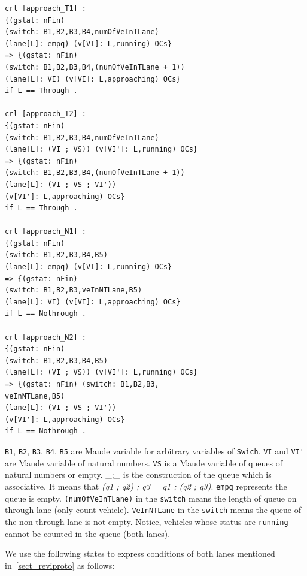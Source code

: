 \documentclass[10pt, conference, compsocconf]{IEEEtran}
\begin{document}
\begin{footnotesize}
\begin{verbatim}
crl [approach_T1] : 
{(gstat: nFin) 
(switch: B1,B2,B3,B4,numOfVeInTLane) 
(lane[L]: empq) (v[VI]: L,running) OCs} 
=> {(gstat: nFin) 
(switch: B1,B2,B3,B4,(numOfVeInTLane + 1)) 
(lane[L]: VI) (v[VI]: L,approaching) OCs} 
if L == Through .

crl [approach_T2] : 
{(gstat: nFin) 
(switch: B1,B2,B3,B4,numOfVeInTLane) 
(lane[L]: (VI ; VS)) (v[VI']: L,running) OCs} 
=> {(gstat: nFin) 
(switch: B1,B2,B3,B4,(numOfVeInTLane + 1)) 
(lane[L]: (VI ; VS ; VI')) 
(v[VI']: L,approaching) OCs} 
if L == Through .

crl [approach_N1] : 
{(gstat: nFin) 
(switch: B1,B2,B3,B4,B5) 
(lane[L]: empq) (v[VI]: L,running) OCs} 
=> {(gstat: nFin) 
(switch: B1,B2,B3,veInNTLane,B5) 
(lane[L]: VI) (v[VI]: L,approaching) OCs} 
if L == Nothrough .

crl [approach_N2] : 
{(gstat: nFin) 
(switch: B1,B2,B3,B4,B5) 
(lane[L]: (VI ; VS)) (v[VI']: L,running) OCs} 
=> {(gstat: nFin) (switch: B1,B2,B3,
veInNTLane,B5) 
(lane[L]: (VI ; VS ; VI')) 
(v[VI']: L,approaching) OCs} 
if L == Nothrough .
\end{verbatim}
\end{footnotesize}



\noindent \verb!B1!, \verb!B2!, \verb!B3!, \verb!B4!, \verb!B5! are Maude variable for arbitrary variables  of \verb!Swich!. 
\verb!VI! and \verb!VI'! are Maude variable of natural numbers. 
\verb!VS! is a Maude variable of queues of natural numbers or empty.
\_;\_ is the construction of the queue which is associative. 
It means that \textit{(q1 ; q2) ; q3 = q1 ; (q2 ; q3)}. 
\verb!empq! represents the queue is empty. 
\verb!(numOfVeInTLane)! in the \verb!switch! means the length of queue on through lane (only count vehicle).
\verb!VeInNTLane! in the \verb!switch! means the queue of the non-through lane is not empty. 
Notice, vehicles whose status are \verb!running! cannot be counted in the queue (both lanes).

We use the following states to express conditions of both lanes mentioned in~\ref{sect_reviproto} as follows:
\end{document}
